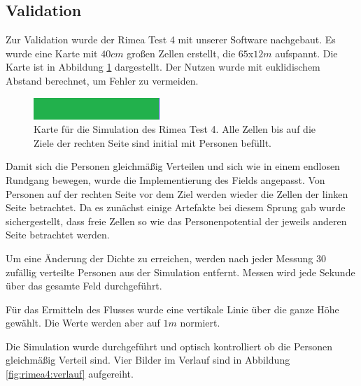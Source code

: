 

\subsection{Validation}

Zur Validation wurde der Rimea Test 4 mit unserer Software nachgebaut. Es wurde eine Karte mit $40cm$ großen Zellen erstellt, die $65$x$12m$ aufspannt.
Die Karte ist in Abbildung \ref{fig:rimea4:map} dargestellt. Der Nutzen wurde mit euklidischem Abstand berechnet, um Fehler zu vermeiden.

\begin{figure}
	\centering
	\includegraphics[width=0.7\linewidth]{abbildungen/fundamentaldiagramm/map}
	\caption{Karte für die Simulation des Rimea Test 4. Alle Zellen bis auf die Ziele der rechten Seite sind initial mit Personen befüllt.}
	\label{fig:rimea4:map}
\end{figure}

Damit sich die Personen gleichmäßig Verteilen und sich wie in einem endlosen Rundgang bewegen, wurde die Implementierung des Fields angepasst. Von Personen auf der rechten Seite vor dem Ziel werden wieder die Zellen der linken Seite betrachtet. Da es zunächst einige Artefakte bei diesem Sprung gab wurde sichergestellt, dass freie Zellen so wie das Personenpotential der jeweils anderen Seite betrachtet werden.

Um eine Änderung der Dichte zu erreichen, werden nach jeder Messung 30 zufällig verteilte Personen aus der Simulation entfernt. Messen wird jede Sekunde über das gesamte Feld durchgeführt.

Für das Ermitteln des Flusses wurde eine vertikale Linie über die ganze Höhe gewählt. Die Werte werden aber auf $1m$ normiert.

Die Simulation wurde durchgeführt und optisch kontrolliert ob die Personen gleichmäßig Verteil sind. Vier Bilder im Verlauf sind in Abbildung \ref{fig:rimea4:verlauf} aufgereiht. 

